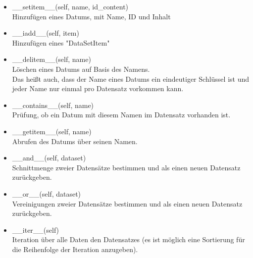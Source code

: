 \documentclass[]{article}
\begin{document}
\begin{itemize}
	\item \_\_setitem\_\_(self, name, id\_content)\\
	\hspace*{1cm} Hinzufügen eines Datums, mit Name, ID und Inhalt\\

	\item \_\_iadd\_\_(self, item)\\
	\hspace*{1cm} Hinzufügen eines "DataSetItem"\\

	\item \_\_delitem\_\_(self, name)\\
	\hspace*{1cm} Löschen eines Datums auf Basis des Namens.\\
	\hspace*{1cm} Das heißt auch, dass der Name eines Datums ein eindeutiger Schlüssel ist und jeder Name nur einmal pro Datensatz vorkommen kann.\\
	
	\item \_\_contains\_\_(self, name)\\ 
	\hspace*{1cm}Prüfung, ob ein Datum mit diesem Namen im Datensatz vorhanden ist.\\

	\item \_\_getitem\_\_(self, name)\\
	\hspace*{1cm} Abrufen des Datums über seinen Namen.\\ 

	\item \_\_and\_\_(self, dataset)\\
	\hspace*{1cm} Schnittmenge zweier Datensätze bestimmen und als einen neuen Datensatz zurückgeben.\\
	
	\item \_\_or\_\_(self, dataset)\\
	\hspace*{1cm} Vereinigungen zweier Datensätze bestimmen und als einen neuen Datensatz zurückgeben.\\ 

	\item \_\_iter\_\_(self)\\
	\hspace*{1cm} Iteration über alle Daten den Datensatzes (es ist möglich eine Sortierung für die Reihenfolge der Iteration anzugeben).\\ 	


\end{itemize}
\end{document}
